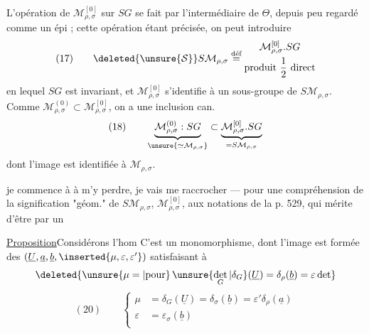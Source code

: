 L'opération de $\mathcal M_{\rho,\sigma}^{[0]}$ sur $SG$ se fait
par l'intermédiaire de $\Theta$, depuis peu regardé comme un épi
;
cette opération étant précisée, on peut introduire
\[
(17)\qquad\deleted{\unsure{\mathcal S}}
S\mathcal M_{\rho,\sigma}\overset{\text{déf}}{=}
\begin{gathered}
\mathcal M_{\rho,\sigma}^{[0]}.SG\\
\text{produit }\frac12\text{ direct}
\end{gathered}
\]
en lequel $SG$ est invariant, et $\mathcal M_{\rho,\sigma}^{[0]}$ s'identifie
à un sous-groupe de $S\mathcal M_{\rho,\sigma}$. Comme
$\mathcal M_{\rho,\sigma}^{(0)}\subset\mathcal M_{\rho,\sigma}^{[0]}$,
on a une inclusion can.
\[
(18)\qquad
\underbrace{\mathcal M_{\rho,\sigma}^{(0)}:SG}_{\unsure{\simeq\mathcal M_{\rho,\sigma}}}
\subset
\underbrace{\mathcal M_{\rho,\sigma}^{[0]}.SG}_{=S\mathcal M_{\rho,\sigma}}
\]
dont l'image est 
identifiée à $\mathcal M_{\rho,\sigma}$.

 je commence à  à m'y perdre, je vais me raccrocher
--- pour une compréhension de la signification "géom." de
$S\mathcal M_{\rho,\sigma}$, $\mathcal M_{\rho,\sigma}^{[0]}$, aux notations
de la p. 529, qui mérite d'être  par un



\uline{Proposition}\quad Considérons l'hom
C'est un monomorphisme, dont l'image est
formée des 
$(\underline U,\underline a,\underline b,\inserted{\mu,\varepsilon,\varepsilon'})$
satisfaisant à
\[
\deleted{\unsure{\mu=|\text{pour}}\,
\unsure{\det_G|\delta_G}(\underline U)
=\delta_\rho(\underline b)=\varepsilon\det}
\]
\[
(20)\qquad\left\{\begin{aligned}
\mu&=\delta_G(\underline U)=\delta_\sigma(\underline b)
=\varepsilon'\delta_\rho(\underline a)\\
\varepsilon&=\varepsilon_\sigma(\underline b)\\[1ex]
\end{aligned}\right.
\]

